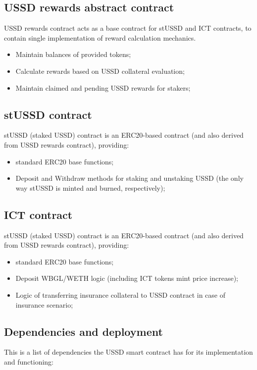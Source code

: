 \subsection{USSD rewards abstract contract}

USSD rewards contract acts as a base contract for stUSSD and ICT contracts, to contain single implementation of reward calculation mechanics.
\begin{itemize}
\item Maintain balances of provided tokens;
\item Calculate rewards based on USSD collateral evaluation;
\item Maintain claimed and pending USSD rewards for stakers;
\end{itemize}

\subsection{stUSSD contract}
stUSSD (staked USSD) contract is an ERC20-based contract (and also derived from USSD rewards contract), providing:
\begin{itemize}
\item standard ERC20 base functions;
\item Deposit and Withdraw methods for staking and unstaking USSD (the only way stUSSD is minted and burned, respectively);
\end{itemize}

\subsection{ICT contract}
stUSSD (staked USSD) contract is an ERC20-based contract (and also derived from USSD rewards contract), providing:
\begin{itemize}
\item standard ERC20 base functions;
\item Deposit WBGL/WETH logic (including ICT tokens mint price increase);
\item Logic of transferring insurance collateral to USSD contract in case of insurance scenario;
\end{itemize}

\subsection{Dependencies and deployment}

This is a list of dependencies the USSD smart contract has for its implementation
and functioning:

